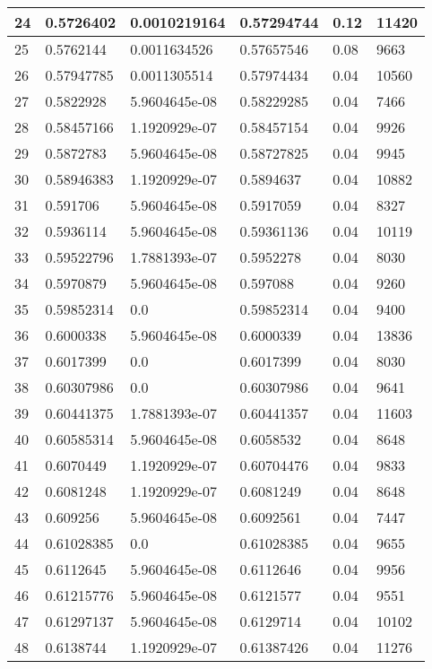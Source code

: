 \begin{longtable}{|l|l|l|l|l|l|}
24 & 0.5726402 & 0.0010219164 & 0.57294744 & 0.12 & 11420 \\ \hline 
25 & 0.5762144 & 0.0011634526 & 0.57657546 & 0.08 & 9663 \\ \hline 
26 & 0.57947785 & 0.0011305514 & 0.57974434 & 0.04 & 10560 \\ \hline 
27 & 0.5822928 & 5.9604645e-08 & 0.58229285 & 0.04 & 7466 \\ \hline 
28 & 0.58457166 & 1.1920929e-07 & 0.58457154 & 0.04 & 9926 \\ \hline 
29 & 0.5872783 & 5.9604645e-08 & 0.58727825 & 0.04 & 9945 \\ \hline 
30 & 0.58946383 & 1.1920929e-07 & 0.5894637 & 0.04 & 10882 \\ \hline 
31 & 0.591706 & 5.9604645e-08 & 0.5917059 & 0.04 & 8327 \\ \hline 
32 & 0.5936114 & 5.9604645e-08 & 0.59361136 & 0.04 & 10119 \\ \hline 
33 & 0.59522796 & 1.7881393e-07 & 0.5952278 & 0.04 & 8030 \\ \hline 
34 & 0.5970879 & 5.9604645e-08 & 0.597088 & 0.04 & 9260 \\ \hline 
35 & 0.59852314 & 0.0 & 0.59852314 & 0.04 & 9400 \\ \hline 
36 & 0.6000338 & 5.9604645e-08 & 0.6000339 & 0.04 & 13836 \\ \hline 
37 & 0.6017399 & 0.0 & 0.6017399 & 0.04 & 8030 \\ \hline 
38 & 0.60307986 & 0.0 & 0.60307986 & 0.04 & 9641 \\ \hline 
39 & 0.60441375 & 1.7881393e-07 & 0.60441357 & 0.04 & 11603 \\ \hline 
40 & 0.60585314 & 5.9604645e-08 & 0.6058532 & 0.04 & 8648 \\ \hline 
41 & 0.6070449 & 1.1920929e-07 & 0.60704476 & 0.04 & 9833 \\ \hline 
42 & 0.6081248 & 1.1920929e-07 & 0.6081249 & 0.04 & 8648 \\ \hline 
43 & 0.609256 & 5.9604645e-08 & 0.6092561 & 0.04 & 7447 \\ \hline 
44 & 0.61028385 & 0.0 & 0.61028385 & 0.04 & 9655 \\ \hline 
45 & 0.6112645 & 5.9604645e-08 & 0.6112646 & 0.04 & 9956 \\ \hline 
46 & 0.61215776 & 5.9604645e-08 & 0.6121577 & 0.04 & 9551 \\ \hline 
47 & 0.61297137 & 5.9604645e-08 & 0.6129714 & 0.04 & 10102 \\ \hline 
48 & 0.6138744 & 1.1920929e-07 & 0.61387426 & 0.04 & 11276 \\ \hline 

\end{longtable}
